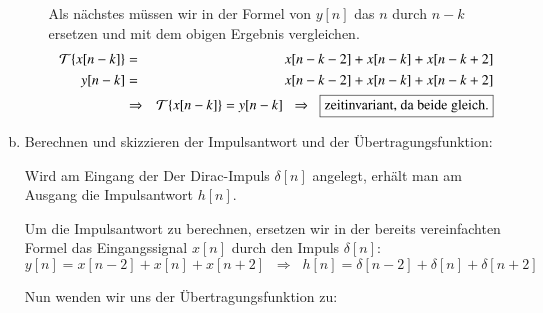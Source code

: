 \begin{uebsp}
\begin{Answer}
\begin{enumerate}[a)]
\begin{enumerate}[1)]
                Als nächstes müssen wir in der Formel von $y[n]$ das $n$ durch
                $n-k$ ersetzen und mit dem obigen Ergebnis vergleichen.
                 \begin{eqnarray*}
                     \mathcal{T}\{x[n-k]\}&=&x[n-k-2]+x[n-k]+x[n-k+2]\\
                    y[n-k]&=&x[n-k-2]+x[n-k]+x[n-k+2]\\
                    &\Rightarrow&\mathcal{T}\{x[n-k]\}=y[n-k]\;\;\Rightarrow\;\;\fbox{zeitinvariant,
                 da beide gleich.}
                \end{eqnarray*}                   
            \end{enumerate}
        \item Berechnen und skizzieren der Impulsantwort und der
            Übertragungsfunktion:
            \label{item:impulsantwort}
            \begin{uebsp_theory}
                Wird am Eingang der Der Dirac-Impuls $\delta[n]$ angelegt,
                erhält man am Ausgang die Impulsantwort $h[n]$.
            \end{uebsp_theory}
            Um die Impulsantwort zu berechnen, ersetzen wir in der bereits
            vereinfachten Formel das Eingangssignal $x[n]$ durch den Impuls 
            $\delta[n]$:
            \[y[n]=x[n-2]+x[n]+x[n+2]\;\;\Rightarrow\;\;
                h[n]=\delta[n-2]+\delta[n]+\delta[n+2]\]
            \begin{center}
            \end{center}
            Nun wenden wir uns der Übertragungsfunktion zu:

\end{enumerate}
\end{Answer}
\end{uebsp}
